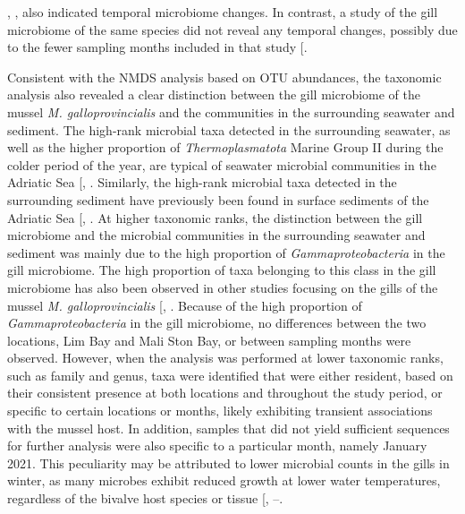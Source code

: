 \documentclass[
  12 pt,
]{article}
\begin{document}
, \citeproc{ref-Wathsala2021}{30}{]}, also indicated temporal microbiome changes. In contrast, a study of the gill microbiome of the same species did not reveal any temporal changes, possibly due to the fewer sampling months included in that study {[}\citeproc{ref-Zardinoni2024}{31}{]}.

Consistent with the NMDS analysis based on OTU abundances, the taxonomic analysis also revealed a clear distinction between the gill microbiome of the mussel \emph{M. galloprovincialis} and the communities in the surrounding seawater and sediment. The high-rank microbial taxa detected in the surrounding seawater, as well as the higher proportion of \emph{Thermoplasmatota} Marine Group II during the colder period of the year, are typical of seawater microbial communities in the Adriatic Sea {[}, \citeproc{ref-Korlevic2022}{101}{]}. Similarly, the high-rank microbial taxa detected in the surrounding sediment have previously been found in surface sediments of the Adriatic Sea {[}, \citeproc{ref-Ramljak2024}{102}{]}. At higher taxonomic ranks, the distinction between the gill microbiome and the microbial communities in the surrounding seawater and sediment was mainly due to the high proportion of \emph{Gammaproteobacteria} in the gill microbiome. The high proportion of taxa belonging to this class in the gill microbiome has also been observed in other studies focusing on the gills of the mussel \emph{M. galloprovincialis} {[}, \citeproc{ref-Zardinoni2024}{31}{]}. Because of the high proportion of \emph{Gammaproteobacteria} in the gill microbiome, no differences between the two locations, Lim Bay and Mali Ston Bay, or between sampling months were observed. However, when the analysis was performed at lower taxonomic ranks, such as family and genus, taxa were identified that were either resident, based on their consistent presence at both locations and throughout the study period, or specific to certain locations or months, likely exhibiting transient associations with the mussel host. In addition, samples that did not yield sufficient sequences for further analysis were also specific to a particular month, namely January 2021. This peculiarity may be attributed to lower microbial counts in the gills in winter, as many microbes exhibit reduced growth at lower water temperatures, regardless of the bivalve host species or tissue {[}, --\citeproc{ref-Sheikh2022}{105}{]}.
\end{document}
